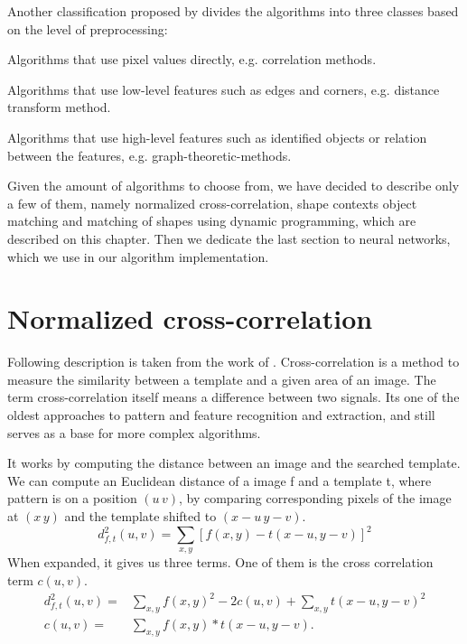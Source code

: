 Another classification proposed by \citet{distanceTransform} divides the algorithms into three classes based on the level of preprocessing:
\begin{description}
\item Algorithms that use pixel values directly, e.g. correlation  methods. 
\item Algorithms that use low-level features such as edges and corners, e.g. distance transform method. 
\item Algorithms that use high-level features such as identified objects or relation between the features, e.g. graph-theoretic-methods. 
\end{description}

Given the amount of algorithms to choose from, we have decided to describe only a few of them, namely normalized cross-correlation, shape contexts object matching and matching of shapes using dynamic programming, which are described on this chapter. Then we dedicate the last section to neural networks, which we use in our algorithm implementation.

\section{Normalized cross-correlation}
Following description is taken from  the work of \cite{crossCorrLewis}.
Cross-correlation is a method to measure the similarity between a template and a given area of an image. The term cross-correlation itself means a difference between two signals. Its one of the oldest approaches to pattern and feature recognition and extraction, and still serves as a base for more complex algorithms.

It works by computing the distance between an image and the searched template. We can compute an Euclidean distance of a image f and a template t, where pattern is on a position $(u\,v)$, by comparing corresponding pixels of the image at $(x\,y)$ and the template shifted to $(x-u\,y-v)$.  
\[d_{f,t}^{2}(u,v)=\sum_{x,y} [ f(x,y) - t(x-u, y-v) ]^{2}\]
When expanded, it gives us three terms. One of them is the cross correlation term $c(u,v)$.
\begin{align*}
d_{f,t}^{2}(u,v)=&\sum_{x,y} f(x,y)^{2} - 2c(u,v) + \sum_{x,y} t(x-u, y-v)^2 \\
c(u,v)=&\sum_{x,y} f(x,y) * t(x-u, y-v).
\end{align*}


